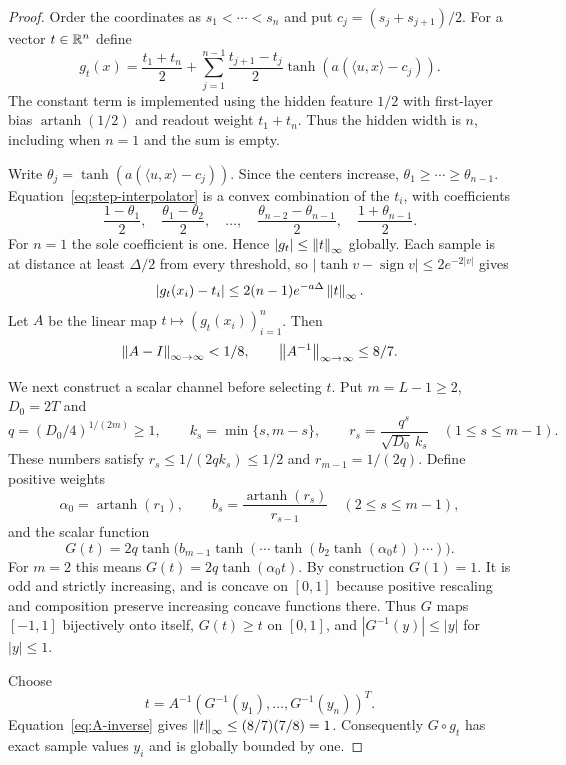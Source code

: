 \begin{proof}
Order the coordinates as $s_1<\cdots<s_n$ and put
$c_j=(s_j+s_{j+1})/2$. For a vector $t\in\mathbb R^n$ define
\begin{equation}\label{eq:step-interpolator}
 g_t(x)=\frac{t_1+t_n}{2}+
 \sum_{j=1}^{n-1}\frac{t_{j+1}-t_j}{2}
       \tanh(a(\langle u,x\rangle-c_j)).
\end{equation}
The constant term is implemented using the hidden feature $1/2$ with
first-layer bias $\operatorname{artanh}(1/2)$ and readout weight
$t_1+t_n$. Thus the hidden width is $n$, including when $n=1$ and
the sum is empty.

Write $\theta_j=\tanh(a(\langle u,x\rangle-c_j))$. Since the
centers increase, $\theta_1\ge\cdots\ge\theta_{n-1}$.
Equation~\eqref{eq:step-interpolator} is a convex combination of the
$t_i$, with coefficients
\[
 \frac{1-\theta_1}{2},\quad
 \frac{\theta_1-\theta_2}{2},\quad\ldots,\quad
 \frac{\theta_{n-2}-\theta_{n-1}}2,\quad
 \frac{1+\theta_{n-1}}2.
\]
For $n=1$ the sole coefficient is one. Hence $|g_t|\le\left\Vert t\right\Vert_\infty$
globally. Each sample is at distance at least $\Delta/2$ from every
threshold, so $|\tanh v-\operatorname{sign}v|\le2e^{-2|v|}$ gives
\[
 |g_t(x_i)-t_i|\le2(n-1)e^{-a\Delta}\left\Vert t\right\Vert_\infty.
\]
Let $A$ be the linear map $t\mapsto(g_t(x_i))_{i=1}^n$. Then
\begin{equation}\label{eq:A-inverse}
 \left\Vert A-I\right\Vert_{\infty\to\infty}<1/8,
 \qquad \left\Vert A^{-1}\right\Vert_{\infty\to\infty}\le8/7.
\end{equation}

We next construct a scalar channel before selecting $t$.
Put $m=L-1\ge2$, $D_0=2T$ and
\[
 q=(D_0/4)^{1/(2m)}\ge1,\qquad
 k_s=\min\{s,m-s\},\qquad
 r_s=\frac{q^s}{\sqrt{D_0}\,k_s}\quad(1\le s\le m-1).
\]
These numbers satisfy $r_s\le1/(2qk_s)\le1/2$ and
$r_{m-1}=1/(2q)$. Define positive weights
\[
 \alpha_0=\operatorname{artanh}(r_1),\qquad
 b_s=\frac{\operatorname{artanh}(r_s)}{r_{s-1}}\quad(2\le s\le m-1),
\]
and the scalar function
\[
 G(t)=2q\tanh\bigl(b_{m-1}\tanh(\cdots\tanh(b_2\tanh(\alpha_0t))\cdots)\bigr).
\]
For $m=2$ this means $G(t)=2q\tanh(\alpha_0t)$.
By construction $G(1)=1$. It is odd and strictly increasing, and is
concave on $[0,1]$ because positive rescaling and composition preserve
increasing concave functions there. Thus $G$ maps $[-1,1]$ bijectively
onto itself, $G(t)\ge t$ on $[0,1]$, and
$|G^{-1}(y)|\le|y|$ for $|y|\le1$.

Choose
\[
 t=A^{-1}(G^{-1}(y_1),\ldots,G^{-1}(y_n))^T.
\]
Equation~\eqref{eq:A-inverse} gives
$\left\Vert t\right\Vert_\infty\le(8/7)(7/8)=1$. Consequently $G\circ g_t$
has exact sample values $y_i$ and is globally bounded by one.


\end{proof}
